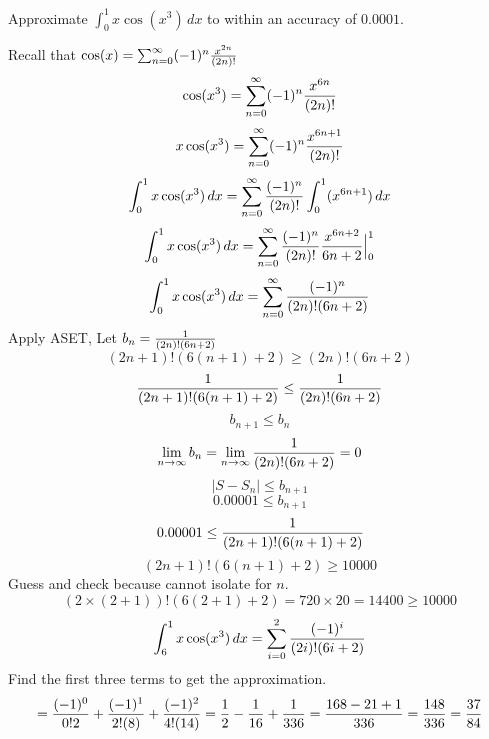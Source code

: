 \documentclass[english, 12pt]{article}
\begin{document}
\begin{exmp}
Approximate $\int_0^1 x \cos(x^3)\,dx$ to within an accuracy of $0.0001$.
\begin{sol}
Recall that $\cos(x) = \sum_{n=0}^\infty (-1)^n \frac{x^{2n}}{(2n)!}$
\[ \cos(x^3) = \sum_{n=0}^\infty (-1)^n \frac{x^{6n}}{(2n)!}\]
\[ x \cos(x^3) = \sum_{n=0}^\infty (-1)^n \frac{x^{6n+1}}{(2n)!}\]
\[ \int_0^1 x \cos(x^3)\,dx = \sum_{n=0}^\infty \frac{(-1)^n}{(2n)!} \int_0^1 (x^{6n+1})\,dx\]
\[ \int_0^1 x \cos(x^3)\,dx = \sum_{n=0}^\infty  \frac{(-1)^n}{(2n)!} \frac{x^{6n+2}}{6n+2}\Big|_0^1\]
\[ \int_0^1 x \cos(x^3)\,dx = \sum_{n=0}^\infty  \frac{(-1)^n}{(2n)! (6n+2)}\]
Apply ASET, Let $b_{n} = \frac{1}{(2n)! (6n+2)}$
\[(2n+1)!(6(n+1) + 2 ) \geq (2n)!(6n+2)\]
\[\frac{1}{(2n+1)!(6(n+1) + 2 )} \leq \frac{1}{(2n)!(6n+2)}\]
\[b_{n+1} \leq b_{n}\]
\[\lim_{n\to\infty} b_{n} = \lim_{n\to\infty} \frac{1}{(2n)! (6n+2)} = 0\]
\[|S - S_{n}| \leq b_{n+1}\]
\[ 0.00001 \leq b_{n+1}\]
\[ 0.00001 \leq \frac{1}{(2n+1)!(6(n+1) + 2 )}\]
\[ (2n+1)!(6(n+1) + 2 ) \geq 10000\]
Guess and check because cannot isolate for $n$.
\[ (2\times (2+1))!(6(2+1) + 2 ) = 720\times 20 = 14400 \geq 10000\]
\[\int_6^1 x \cos (x^3)\,dx = \sum_{i=0}^2 \frac{(-1)^i}{(2i)! (6i+2)}\]
Find the first three terms to get the approximation.
\[ = \frac{(-1)^0}{0! 2} + \frac{(-1)^1}{2!(8)} + \frac{(-1)^2}{4! (14)} = \frac{1}{2} - \frac{1}{16} + \frac{1}{336} = \frac{168-21 + 1}{336} = \frac{148}{336} = \frac{37}{84}\]
\end{sol}
\end{exmp}

\end{document}
